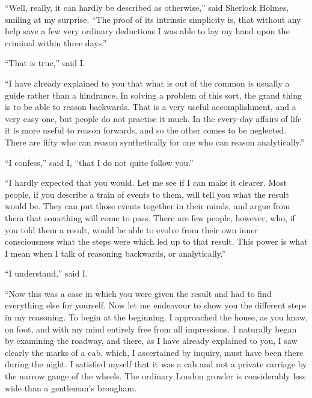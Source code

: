 \documentclass[12pt]{book}
\begin{document}
“Well, really, it can hardly be described as otherwise,” said Sherlock Holmes, smiling at my surprise. “The proof of its intrinsic simplicity is, that without any help save a few very ordinary deductions I was able to lay my hand upon the criminal within three days.” 

“That is true,” said I. 

“I have already explained to you that what is out of the common is usually a guide rather than a hindrance. In solving a problem of this sort, the grand thing is to be able to reason backwards. That is a very useful accomplishment, and a very easy one, but people do not practise it much. In the every-day affairs of life it is more useful to reason forwards, and so the other comes to be neglected. There are fifty who can reason synthetically for one who can reason analytically.” 

“I confess,” said I, “that I do not quite follow you.” 

“I hardly expected that you would. Let me see if I can make it clearer. Most people, if you describe a train of events to them, will tell you what the result would be. They can put those events together in their minds, and argue from them that something will come to pass. There are few people, however, who, if you told them a result, would be able to evolve from their own inner consciousness what the steps were which led up to that result. This power is what I mean when I talk of reasoning backwards, or analytically.” 

“I understand,” said I. 

“Now this was a case in which you were given the result and had to find everything else for yourself. Now let me endeavour to show you the different steps in my reasoning. To begin at the beginning. I approached the house, as you know, on foot, and with my mind entirely free from all impressions. I naturally began by examining the roadway, and there, as I have already explained to you, I saw clearly the marks of a cab, which, I ascertained by inquiry, must have been there during the night. I satisfied myself that it was a cab and not a private carriage by the narrow gauge of the wheels. The ordinary London growler is considerably less wide than a gentleman’s brougham. 
\end{document}
